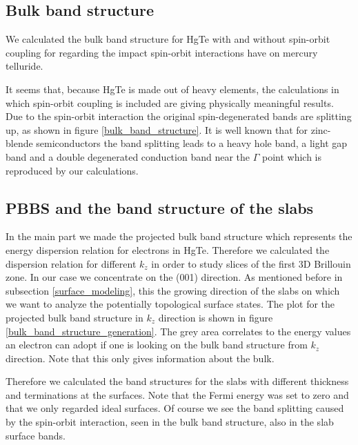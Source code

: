 \subsection{Bulk band structure}
	We calculated the bulk band structure for HgTe with and without spin-orbit coupling for regarding the impact spin-orbit interactions have on mercury telluride. 
	
	It seems that, because HgTe is made out of heavy elements, the calculations in which spin-orbit coupling is included are giving  physically meaningful results. Due to the spin-orbit interaction the original spin-degenerated bands are splitting up, as shown in figure \ref{bulk_band_structure}. 
	It is well known that for zinc-blende semiconductors the band splitting leads to a heavy hole band, a light gap band and a double degenerated conduction band near the $\Gamma$ point \cite{HgTe_structure_001} which is reproduced by our calculations. 
	
\subsection{PBBS and the band structure of the slabs}
	In the main part we made the projected bulk band structure which represents the energy dispersion relation for electrons in HgTe. Therefore we calculated the dispersion relation for different $k_z$ in order to study slices of the first 3D Brillouin zone. In our case we concentrate on the (001) direction. As mentioned before in subsection \ref{surface_modeling}, this the growing direction of the slabs on which we want to analyze the potentially topological surface states. The plot for the projected bulk band structure in $k_z$ direction is shown in figure \ref{bulk_band_structure_generation}.  The grey area correlates to the energy values an electron can adopt if one is looking on the bulk band structure from $k_z$ direction. Note that this only gives information about the bulk. 
	
	Therefore we calculated the band structures for the slabs with different thickness and terminations at the surfaces. Note that the Fermi energy was set to zero and that we only regarded ideal surfaces. Of course we see the band splitting caused by the spin-orbit interaction, seen in the bulk band structure, also in the slab surface bands.
	
